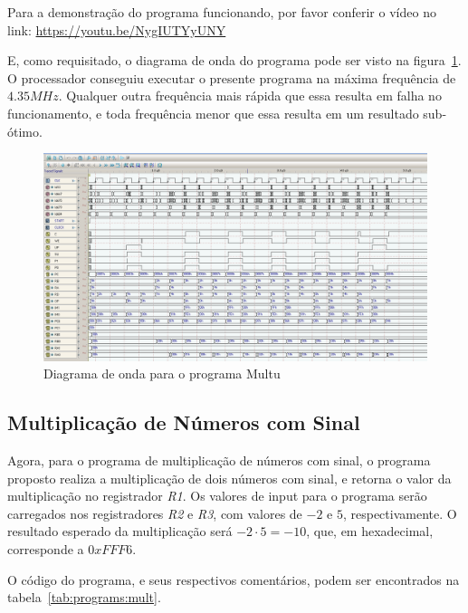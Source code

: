\documentclass[12pt]{article}
\begin{document}
Para a demonstração do programa funcionando, por favor conferir o vídeo no link:
\href{https://youtu.be/NygIUTYyUNY}{https://youtu.be/NygIUTYyUNY}

E, como requisitado, o diagrama de onda do programa pode ser visto na
figura~\ref{fig:program__multu_wave.png}. O processador conseguiu executar o
presente programa na máxima frequência de $4.35MHz$. Qualquer outra frequência
mais rápida que essa resulta em falha no funcionamento, e toda frequência menor
que essa resulta em um resultado sub-ótimo.

\begin{figure}[H]
    \centering
    \includegraphics[width=.9\textwidth]{Projeto/images/program__multu_wave.png}
    \caption{Diagrama de onda para o programa Multu}\label{fig:program__multu_wave.png}
\end{figure}

\subsection{Multiplicação de Números com Sinal}\label{sec:programs:mult}

Agora, para o programa de multiplicação de números com sinal, o programa
proposto realiza a multiplicação de dois números com sinal, e retorna o valor da
multiplicação no registrador \emph{R1}. Os valores de input para o programa
serão carregados nos registradores \emph{R2} e \emph{R3}, com valores de $-2$ e
$5$, respectivamente. O resultado esperado da multiplicação será
$-2 \cdot 5 = -10$, que, em hexadecimal, corresponde a $0xFFF6$.

O código do programa, e seus respectivos comentários, podem ser encontrados na
tabela~\ref{tab:programs:mult}.
\end{document}
